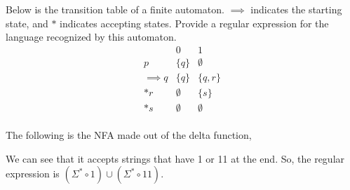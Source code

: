 \documentclass[addpoints]{exam}
\begin{document}
\begin{questions}
	\newpage

	\question[5] Below is the transition table of a finite automaton. $\implies$ indicates the starting state, and $*$ indicates accepting states. Provide a regular expression for the language recognized by this automaton.
	\[
		\begin{array}{r|cc}
			           & 0         & 1          \\\hline
			p          & \{ q \}   & \emptyset  \\
			\implies q & \{ q \}   & \{ q, r \} \\
			*r         & \emptyset & \{ s \}    \\
			*s         & \emptyset & \emptyset  \\
		\end{array}
	\]
	\begin{solution}
		The following is the NFA made out of the delta function,
		\begin{center}
		\end{center}
		We can see that it accepts strings that have 1 or 11 at the end. So, the regular expression is \(\left(\Sigma^*\circ 1\right)\cup\left(\Sigma^*\circ 11\right)\).
	\end{solution}

	\question
	\begin{parts}

\end{parts}
\end{questions}
\end{document}
